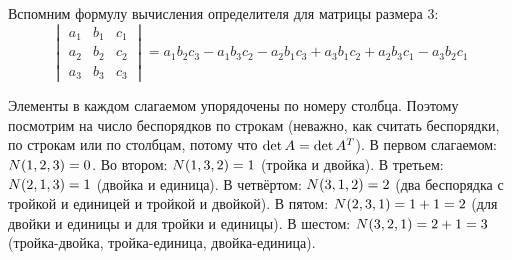 \documentclass[a4paper,12pt]{article}
\theoremstyle{remark}
\begin{document}
  \begin{example}
    Вспомним формулу вычисления определителя для матрицы размера $3$:
    \begin{equation}\label{eq:full-expansion-3x3}
      \begin{vmatrix}
        a_1 & b_1 & c_1\\
        a_2 & b_2 & c_2\\
        a_3 & b_3 & c_3
      \end{vmatrix}
        = a_1 b_2 c_3 - a_1 b_3 c_2 - a_2 b_1 c_3 + a_3 b_1 c_2 + a_2 b_3 c_1 - a_3 b_2 c_1
    \end{equation}
    
    Элементы в каждом слагаемом упорядочены по номеру столбца.
    Поэтому посмотрим на число беспорядков по строкам (неважно, как считать беспорядки, по строкам или по столбцам, потому что $\det A \hm= \det A^T$).
    В первом слагаемом: $N(1, 2, 3) \hm= 0$.
    Во втором: $N(1, 3, 2) \hm= 1$ (тройка и двойка).
    В третьем: $N(2, 1, 3) \hm= 1$ (двойка и единица).
    В четвёртом: $N(3, 1, 2) \hm= 2$ (два беспорядка с тройкой и единицей и тройкой и двойкой).
    В пятом: $N(2, 3, 1) \hm= 1 \hm+ 1 \hm= 2$ (для двойки и единицы и для тройки и единицы).
    В шестом: $N(3, 2, 1) \hm= 2 \hm+ 1 \hm= 3$ (тройка-двойка, тройка-единица, двойка-единица).
  \end{example}
  
\end{document}
